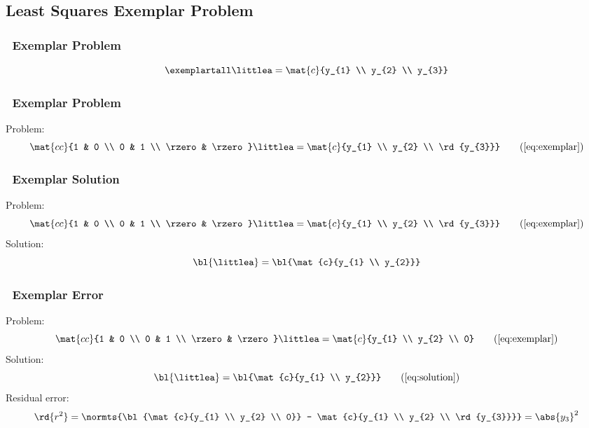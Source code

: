\subsection{Least Squares Exemplar Problem}
%
\begin{frame}\frametitle{\lsq \ Exemplar Problem}
\begin{equation}
	\exemplartall \littlea = \mat{c}{y_{1} \\ y_{2} \\ y_{3}}
\label{eq:exemplar}
\end{equation}
\end{frame}
%
\begin{frame}\frametitle{\lsq \ Exemplar Problem}
Problem:
\begin{equation}
	\mat{cc}{1 & 0 \\ 0 & 1 \\ \rzero & \rzero} \littlea = \mat{c}{y_{1} \\ y_{2} \\ \rd{y_{3}}}
\tag{\ref{eq:exemplar}}
\end{equation}
\end{frame}
%
\begin{frame}\frametitle{\lsq \ Exemplar Solution}
Problem:
\begin{equation}
	\mat{cc}{1 & 0 \\ 0 & 1 \\ \rzero & \rzero} \littlea = \mat{c}{y_{1} \\ y_{2} \\ \rd{y_{3}}}
\tag{\ref{eq:exemplar}}
\end{equation}
Solution:
\begin{equation}
	\bl{\littlea} = \bl{\mat{c}{y_{1} \\ y_{2}}}
\label{eq:solution}
\end{equation}
\end{frame}

\begin{frame}\frametitle{\lsq \ Exemplar Error}
Problem:
\begin{equation}
	\mat{cc}{1 & 0 \\ 0 & 1 \\ \rzero & \rzero} \littlea = \mat{c}{y_{1} \\ y_{2} \\ 0}
\tag{\ref{eq:exemplar}}
\end{equation}
Solution:
\begin{equation}
	\bl{\littlea} = \bl{\mat{c}{y_{1} \\ y_{2}}}
\tag{\ref{eq:solution}}
\end{equation}
%
Residual error:
\begin{equation}
	\rd{r^{2}} = \normts{\bl{\mat{c}{y_{1} \\ y_{2} \\ 0}} - \mat{c}{y_{1} \\ y_{2} \\ \rd{y_{3}}}} = \abs{y_{3}}^{2}
\label{eq:error}
\end{equation}
%
\end{frame}
%
